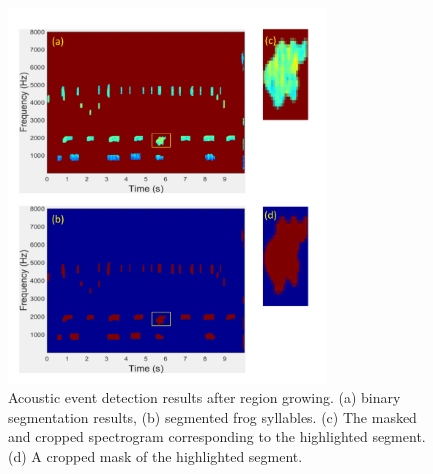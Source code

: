 
\begin{figure}[htb!]
\centering
\includegraphics[width=0.75\textwidth, height = 0.9\textwidth]{image/Ch6/contentShape.pdf}
\caption[Acoustic event detection results after region growing]{Acoustic event detection results after region growing. (a) binary segmentation results, (b) segmented frog syllables. (c) The masked and cropped spectrogram corresponding to the highlighted segment. (d) A cropped mask of the highlighted segment.}
\label{fig:Ch6_AED}
\end{figure}






